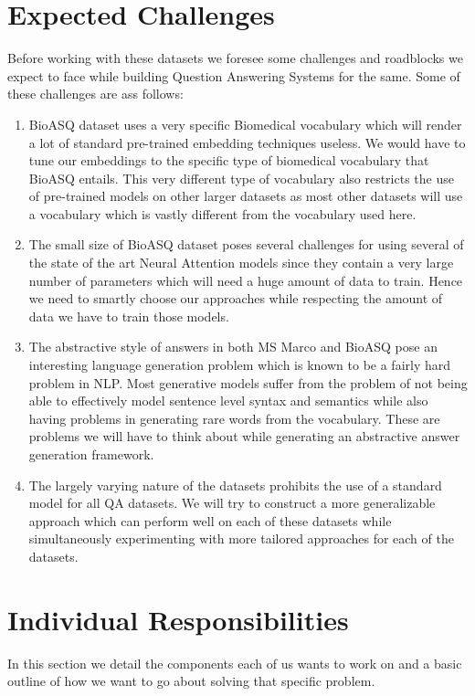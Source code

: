 \documentclass{article}
\begin{document}
\section{Expected Challenges}
Before working with these datasets we foresee some challenges and roadblocks we expect to face while building Question Answering Systems for the same. Some of these challenges are ass follows:\\
\begin{enumerate}
    \item BioASQ dataset uses a very specific Biomedical vocabulary which will render a lot of standard pre-trained embedding techniques useless. We would have to tune our embeddings to the specific type of biomedical vocabulary that BioASQ entails. This very different type of vocabulary also restricts the use of pre-trained models on other larger datasets as most other datasets will use a vocabulary which is vastly different from the vocabulary used here.
    \item The small size of BioASQ dataset poses several challenges for using several of the state of the art Neural Attention models since they contain a very large number of parameters which will need a huge amount of data to train. Hence we need to smartly choose our approaches while respecting the amount of data we have to train those models.
    \item The abstractive style of answers in both MS Marco and BioASQ pose an interesting language generation problem which is known to be a fairly hard problem in NLP. Most generative models suffer from the problem of not being able to effectively model sentence level syntax and semantics while also having problems in generating rare words from the vocabulary. These are problems we will have to think about while generating an abstractive answer generation framework.
    \item The largely varying nature of the datasets prohibits the use of a standard model for all QA datasets. We will try to construct a more generalizable approach which can perform well on each of these datasets while simultaneously experimenting with more tailored approaches for each of the datasets.
\end{enumerate}

\pagebreak

\section{Individual Responsibilities}
In this section we detail the components each of us wants to work on and a basic outline of how we want to go about solving that specific problem.\\
\end{document}
